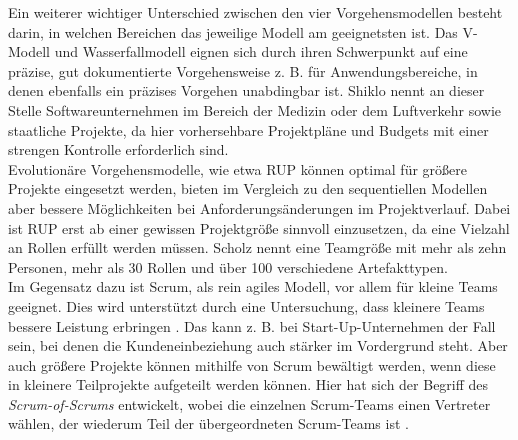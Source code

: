 Ein weiterer wichtiger Unterschied zwischen den vier Vorgehensmodellen besteht darin, in welchen Bereichen das jeweilige Modell am geeignetsten ist. Das V-Modell und Wasserfallmodell eignen sich durch ihren Schwerpunkt auf eine präzise, gut dokumentierte Vorgehensweise z. B. für Anwendungsbereiche, in denen ebenfalls ein präzises Vorgehen unabdingbar ist. Shiklo \cite{Shiklo:2019:8-Vorgehensmodelle:12} nennt an dieser Stelle Softwareunternehmen im Bereich der Medizin oder dem Luftverkehr sowie staatliche Projekte, da hier vorhersehbare Projektpläne und Budgets mit einer strengen Kontrolle erforderlich sind. 
\\
Evolutionäre Vorgehensmodelle, wie etwa RUP können optimal für größere Projekte eingesetzt werden, bieten im Vergleich zu den sequentiellen Modellen aber bessere Möglichkeiten bei Anforderungsänderungen im Projektverlauf. Dabei ist RUP erst ab einer gewissen Projektgröße sinnvoll einzusetzen, da eine Vielzahl an Rollen erfüllt werden müssen. Scholz \cite[150]{Scholz:2005:Softwareentwicklung:09} nennt eine Teamgröße mit mehr als zehn Personen, mehr als 30 Rollen und über 100 verschiedene Artefakttypen. 
\\
Im Gegensatz dazu ist Scrum, als rein agiles Modell, vor allem für kleine Teams geeignet. Dies wird unterstützt durch eine Untersuchung, dass kleinere Teams bessere Leistung erbringen \cite{Hackman:1970:Effects:85}. Das kann z. B. bei Start-Up-Unternehmen der Fall sein, bei denen die Kundeneinbeziehung auch stärker im Vordergrund steht. Aber auch größere Projekte können mithilfe von Scrum bewältigt werden, wenn diese in kleinere Teilprojekte aufgeteilt werden können. Hier hat sich der Begriff des \emph{Scrum-of-Scrums} entwickelt, wobei die einzelnen Scrum-Teams einen Vertreter wählen, der wiederum Teil der übergeordneten Scrum-Teams ist \cite[227]{Dalton:2019:Great:62}.
